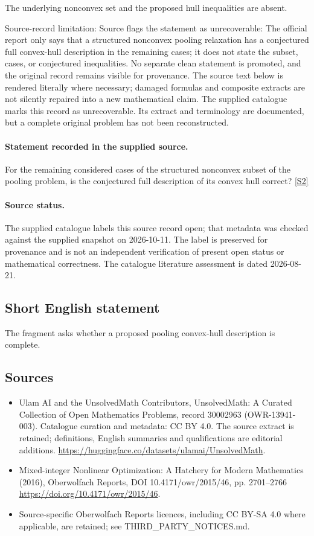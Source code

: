 \documentclass[11pt]{article}
\begin{document}
The underlying nonconvex set and the proposed hull inequalities are absent.

Source-record limitation: Source flags the statement as unrecoverable: The official report only says that a structured nonconvex pooling relaxation has a conjectured full convex-hull description in the remaining cases; it does not state the subset, cases, or conjectured inequalities. No separate clean statement is promoted, and the original record remains visible for provenance.
The source text below is rendered literally where necessary; damaged formulas and composite extracts are not silently repaired into a new mathematical claim.
The supplied catalogue marks this record as unrecoverable. Its extract and terminology are documented, but a complete original problem has not been reconstructed.
\paragraph{Statement recorded in the supplied source.}
For the remaining considered cases of the structured nonconvex subset of the pooling problem, is the conjectured full description of its convex hull correct? \href{https://doi.org/10.4171/owr/2015/46}{[S2]}
\paragraph{Source status.}
The supplied catalogue labels this source record open; that metadata was checked against the supplied snapshot on 2026-10-11. The label is preserved for provenance and is not an independent verification of present open status or mathematical correctness. The catalogue literature assessment is dated 2026-08-21.
\subsection{Short English statement}
The fragment asks whether a proposed pooling convex-hull description is complete.
\subsection{Sources}
\begin{itemize}
\item[S1] Ulam AI and the UnsolvedMath Contributors, UnsolvedMath: A Curated Collection of Open Mathematics Problems, record 30002963 (OWR-13941-003). Catalogue curation and metadata: CC BY 4.0. The source extract is retained; definitions, English summaries and qualifications are editorial additions.
\url{https://huggingface.co/datasets/ulamai/UnsolvedMath}.
\item[S2] Mixed-integer Nonlinear Optimization: A Hatchery for Modern Mathematics (2016), Oberwolfach Reports, DOI 10.4171/owr/2015/46, pp. 2701--2766
\url{https://doi.org/10.4171/owr/2015/46}.
\item Source-specific Oberwolfach Reports licences, including CC BY-SA 4.0 where applicable, are retained; see THIRD\_PARTY\_NOTICES.md.
\end{itemize}
\end{document}
